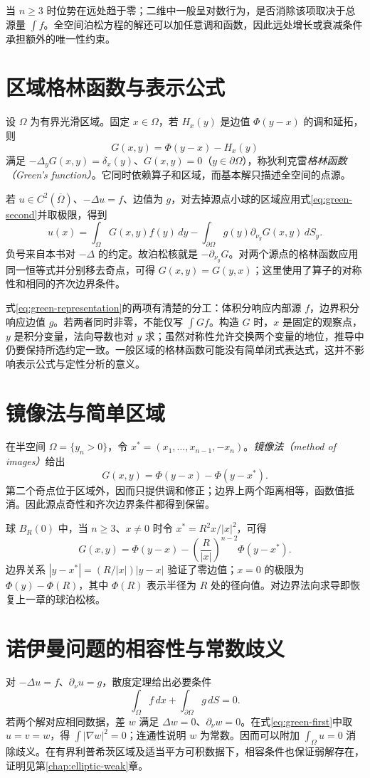 当 $n\ge3$ 时位势在远处趋于零；二维中一般呈对数行为，是否消除该项取决于总源量 $\int f$。全空间泊松方程的解还可以加任意调和函数，因此远处增长或衰减条件承担额外的唯一性约束。

\section{区域格林函数与表示公式}
设 $\Omega$ 为有界光滑区域。固定 $x\in\Omega$，若 $H_x(y)$ 是边值 $\Phi(y-x)$ 的调和延拓，则
\[
 G(x,y)=\Phi(y-x)-H_x(y)
\]
满足 $-\Delta_yG(x,y)=\delta_x(y)$、$G(x,y)=0$（$y\in\partial\Omega$），称狄利克雷\emph{格林函数（Green's function）}。它同时依赖算子和区域，而基本解只描述全空间的点源。

若 $u\in C^2(\overline\Omega)$、$-\Delta u=f$、边值为 $g$，对去掉源点小球的区域应用式\eqref{eq:green-second}并取极限，得到
\begin{equation}
 u(x)=\int_\Omega G(x,y)f(y)\,dy-
       \int_{\partial\Omega}g(y)\partial_{\nu_y}G(x,y)\,dS_y.
 \label{eq:green-representation}
\end{equation}
负号来自本书对 $-\Delta$ 的约定。故泊松核就是 $-\partial_{\nu_y}G$。对两个源点的格林函数应用同一恒等式并分别移去奇点，可得 $G(x,y)=G(y,x)$；这里使用了算子的对称性和相同的齐次边界条件。

式\eqref{eq:green-representation}的两项有清楚的分工：体积分响应内部源 $f$，边界积分响应边值 $g$。若两者同时非零，不能仅写 $\int Gf$。构造 $G$ 时，$x$ 是固定的观察点，$y$ 是积分变量，法向导数也对 $y$ 求；虽然对称性允许交换两个变量的地位，推导中仍要保持所选约定一致。一般区域的格林函数可能没有简单闭式表达式，这并不影响表示公式与定性分析的意义。

\section{镜像法与简单区域}
在半空间 $\Omega=\{y_n>0\}$，令 $x^*=(x_1,\ldots,x_{n-1},-x_n)$。\emph{镜像法（method of images）}给出
\[
 G(x,y)=\Phi(y-x)-\Phi(y-x^*).
\]
第二个奇点位于区域外，因而只提供调和修正；边界上两个距离相等，函数值抵消。因此源点奇性和齐次边界条件都得到保留。

球 $B_R(0)$ 中，当 $n\ge3$、$x\ne0$ 时令 $x^*=R^2x/|x|^2$，可得
\[
 G(x,y)=\Phi(y-x)-\left(\frac R{|x|}\right)^{n-2}\Phi(y-x^*).
\]
边界关系 $|y-x^*|=(R/|x|)|y-x|$ 验证了零边值；$x=0$ 的极限为 $\Phi(y)-\Phi(R)$，其中 $\Phi(R)$ 表示半径为 $R$ 处的径向值。对边界法向求导即恢复上一章的球泊松核。

\section{诺伊曼问题的相容性与常数歧义}
对 $-\Delta u=f$、$\partial_\nu u=g$，散度定理给出必要条件
\begin{equation}
 \int_\Omega f\,dx+\int_{\partial\Omega}g\,dS=0.
 \label{eq:neumann-compatibility}
\end{equation}
若两个解对应相同数据，差 $w$ 满足 $\Delta w=0$、$\partial_\nu w=0$。在式\eqref{eq:green-first}中取 $u=v=w$，得 $\int|\nabla w|^2=0$；连通性说明 $w$ 为常数。因而可以附加 $\int_\Omega u=0$ 消除歧义。在有界利普希茨区域及适当平方可积数据下，相容条件也保证弱解存在，证明见第\ref{chap:elliptic-weak}章。

